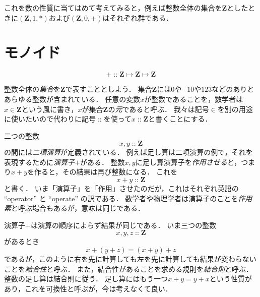 \documentclass[twocolumn]{jsbook}
\newcommand{\keyword}[1]{\emph{#1}}
\newcommand{\binaryadd}{+}
\newcommand{\istypeof}{\mathop{::}}
\newcommand{\mathsetname}[1]{\boldsymbol{#1}}
\begin{document}
これを数の性質に当てはめて考えてみると，例えば整数全体の集合を$\mathsetname{Z}$としたときに$(\mathsetname{Z},1,*)$および$(\mathsetname{Z},0,+)$はそれぞれ群である．






\section{モノイド}


$$+\istypeof\mathsetname{Z}\mapsto\mathsetname{Z}\mapsto\mathsetname{Z}$$


整数全体の\keyword{集合}を$\mathsetname{Z}$で表すこととしよう．
集合$\mathsetname{Z}$には$0$や$-10$や$123$などのありとあらゆる整数が含まれている．
任意の変数$x$が整数であることを，数学者は$x\in\mathsetname{Z}$という風に書き，$x$が集合$\mathsetname{Z}$の\keyword{元}であると呼ぶ．
我々は記号$\in$を別の用途に使いたいので代わりに記号$\istypeof$を使って$x\istypeof\mathsetname{Z}$と書くことにする．

二つの整数$$x,y\istypeof\mathsetname{Z}$$の間には\keyword{二項演算}が定義されている．
例えば足し算は二項演算の例で，それを表現するために\keyword{演算子}$+$がある．
整数$x,y$に足し算演算子を\keyword{作用させる}と，つまり$x+y$を作ると，その結果は再び整数になる．
これを$$x+y\istypeof\mathsetname{Z}$$と書く．
いま「演算子」を「作用」させたのだが，これはそれぞれ英語の ``operator'' と ``operate'' の訳である．
数学者や物理学者は演算子のことを\keyword{作用素}と呼ぶ場合もあるが，意味は同じである．


演算子$\binaryadd$は演算の順序によらず結果が同じである．
いま三つの整数$$x,y,z\istypeof\mathsetname{Z}$$があるとき$$x+(y+z)=(x+y)+z$$であるが，このように右を先に計算しても左を先に計算しても結果が変わらないことを\keyword{結合性}と呼ぶ．
また，結合性があることを求める規則を\keyword{結合則}と呼ぶ．
整数の足し算は結合則に従う．
足し算にはもう一つ$x+y=y+x$という性質があり，これを可換性と呼ぶが，今は考えなくて良い．
\end{document}
